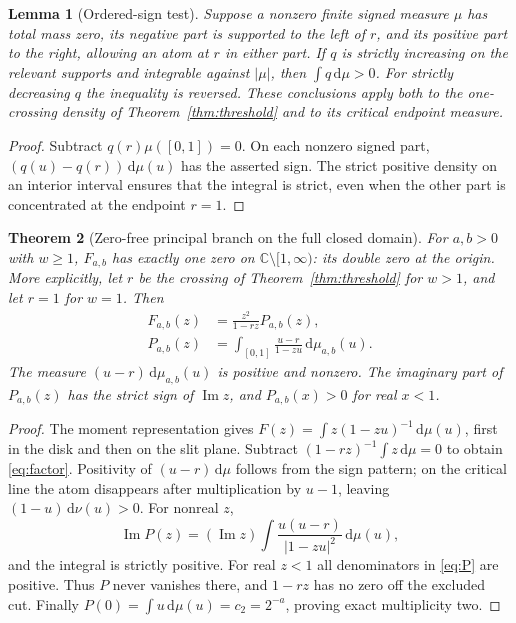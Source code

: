 \documentclass[11pt]{article}
\numberwithin{equation}{section}
\newtheorem{theorem}{Theorem}[section]
\newtheorem{lemma}[theorem]{Lemma}
\theoremstyle{definition}\newtheorem{definition}[theorem]{Definition}
\theoremstyle{remark}\newtheorem{remark}[theorem]{Remark}
\newcommand{\dd}{\,\mathrm d}
\newcommand{\C}{\mathbb C}
\DeclareMathOperator{\Impart}{Im}
\newcommand{\cut}{\C\setminus[1,\infty)}
\begin{document}
\begin{lemma}[Ordered-sign test]\label{lem:sign}
Suppose a nonzero finite signed measure $\mu$ has total mass zero,
its negative part is supported to the left of $r$, and its positive
part to the right, allowing an atom at $r$ in either part. If $q$ is
strictly increasing on the relevant supports and integrable against
$|\mu|$, then $\int q\dd\mu>0$. For strictly decreasing $q$ the
inequality is reversed. These conclusions apply both to the
one-crossing density of Theorem~\ref{thm:threshold} and to its critical
endpoint measure.
\end{lemma}
\begin{proof}
Subtract $q(r)\mu([0,1])=0$. On each nonzero signed part,
$(q(u)-q(r))\dd\mu(u)$ has the asserted sign. The strict positive
density on an interior interval ensures that the integral is strict,
even when the other part is concentrated at the endpoint $r=1$.
\end{proof}

\begin{theorem}[Zero-free principal branch on the full closed domain]
\label{thm:zerofree}
For $a,b>0$ with $w\ge1$, $F_{a,b}$ has exactly one zero on
$\cut$: its double zero at the origin. More explicitly, let $r$ be
the crossing of Theorem~\ref{thm:threshold} for $w>1$, and let $r=1$
for $w=1$. Then
\begin{align}
 F_{a,b}(z)&=\frac{z^2}{1-rz}P_{a,b}(z),\label{eq:factor}\\
 P_{a,b}(z)&=\int_{[0,1]}\frac{u-r}{1-zu}\dd\mu_{a,b}(u).
 \label{eq:P}
\end{align}
The measure $(u-r)\dd\mu_{a,b}(u)$ is positive and nonzero.
The imaginary part of $P_{a,b}(z)$ has the strict sign of
$\Impart z$, and $P_{a,b}(x)>0$ for real $x<1$.
\end{theorem}
\begin{proof}
The moment representation gives
$F(z)=\int z(1-zu)^{-1}\dd\mu(u)$, first in the disk and then on
the slit plane. Subtract $(1-rz)^{-1}\int z\dd\mu=0$ to obtain
\eqref{eq:factor}. Positivity of $(u-r)\dd\mu$ follows from the sign
pattern; on the critical line the atom disappears after multiplication
by $u-1$, leaving $(1-u)\dd\nu(u)>0$.
For nonreal $z$,
\[
 \Impart P(z)=(\Impart z)
   \int\frac{u(u-r)}{|1-zu|^2}\dd\mu(u),
\]
and the integral is strictly positive. For real $z<1$ all denominators
in \eqref{eq:P} are positive. Thus $P$ never vanishes there, and
$1-rz$ has no zero off the excluded cut. Finally
$P(0)=\int u\dd\mu(u)=c_2=2^{-a}$, proving exact multiplicity two.
\end{proof}
\end{document}
